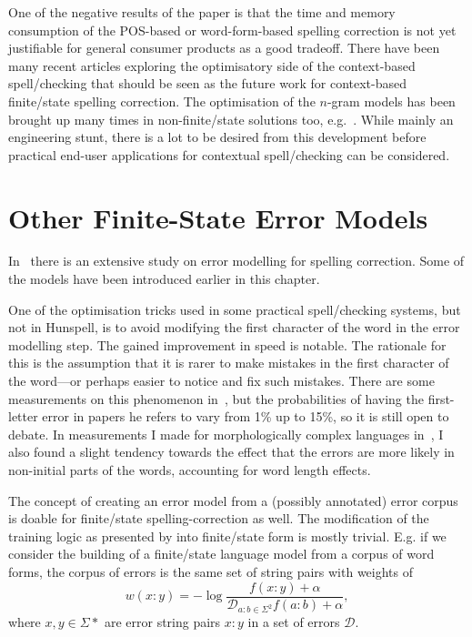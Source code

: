 \documentclass[officiallayout]{unihelcompling}
\begin{document}
One of the negative results of the paper is that the time and memory
consumption of the POS-based or word-form-based spelling correction is not yet
justifiable for general consumer products as a good tradeoff. There have been
many recent articles exploring the optimisatory side of the context-based
spell\-/checking that should be seen as the future work for context-based
finite\-/state spelling correction. The optimisation of the \(n\)-gram models has
been brought up many times in non-finite\-/state solutions too,
e.g.~\citet{church2007compressing}. While mainly an engineering stunt, there is
a lot to be desired from this development before practical end-user
applications for contextual spell\-/checking can be considered.

\section{Other Finite-State Error Models}
\label{sec:other-errors}

In~\citet{deorowicz2005correcting} there is an extensive study on error
modelling for spelling correction. Some of the models have been
introduced earlier in this chapter.

One of the optimisation tricks used in some practical spell\-/checking systems,
but not in Hunspell, is to avoid modifying the first character of the word in
the error modelling step. The gained improvement in speed is notable. The
rationale for this is the assumption that it is rarer to make mistakes in the
first character of the word---or perhaps easier to notice and fix such
mistakes. There are some measurements on this phenomenon
in~\citet{bhagat2007spelling}, but the probabilities of having the first-letter
error in papers he refers to vary from 1\% up to 15\%, so it is still open to
debate. In measurements I made for morphologically complex languages
in~, I also found a slight tendency towards
the effect that the errors are more likely in non-initial parts of the words,
accounting for word length effects.

The concept of creating an error model from a (possibly annotated) error corpus
is doable for finite\-/state spelling-correction as well. The modification of
the training logic as presented by \citep{church1991probability} into
finite\-/state form is mostly trivial. E.g. if we consider the building of a
finite\-/state language model from a corpus of word forms, the corpus of errors
is the same set of string pairs with weights of 
\begin{equation}
    w(x:y) = -\log\frac{f(x:y) + \alpha}{\mathcal{D}_{a:b \in \Sigma^2} f(a:b) + \alpha},
\end{equation}
where $x, y \in \Sigma*$ are error string pairs $x:y$ in a set of errors
$\mathcal{D}$.
\end{document}

